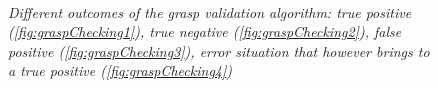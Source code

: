 \begin{figure}
	\centering
	\\
		
	\caption{\textit{Different outcomes of the grasp validation algorithm: true positive (\ref{fig:graspChecking1}), true negative (\ref{fig:graspChecking2}), false positive (\ref{fig:graspChecking3}), error situation that however brings to a true positive (\ref{fig:graspChecking4})}}
	\label{fig:graspChecking}
\end{figure}


